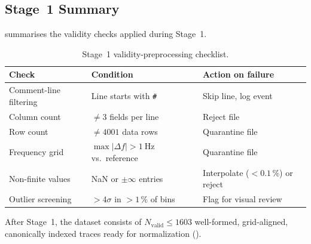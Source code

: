 \subsection{Stage~1 Summary}
\label{sec:preproc:summary}

 summarises the validity checks applied
during Stage~1.

\begin{table}[ht]
\centering
\caption{Stage~1 validity-preprocessing checklist.}
\label{tab:preproc_checklist}
\small
\begin{tabular}{p{4.0cm} p{4.5cm} p{3.8cm}}
\toprule
\textbf{Check} & \textbf{Condition} & \textbf{Action on failure} \\
\midrule
Comment-line filtering &
  Line starts with \texttt{\#} &
  Skip line, log event \\
Column count &
  $\neq 3$ fields per line &
  Reject file \\
Row count &
  $\neq 4001$ data rows &
  Quarantine file \\
Frequency grid &
  $\max|\Delta f| > \SI{1}{\hertz}$ vs.\ reference &
  Quarantine file \\
Non-finite values &
  NaN or $\pm\infty$ entries &
  Interpolate ($<0.1\,\%$) or reject \\
Outlier screening &
  $>4\sigma$ in $>1\,\%$ of bins &
  Flag for visual review \\
\bottomrule
\end{tabular}
\end{table}

After Stage~1, the dataset consists of $N_{\text{valid}} \leq 1603$
well-formed, grid-aligned, canonically indexed traces ready for
normalization ().
